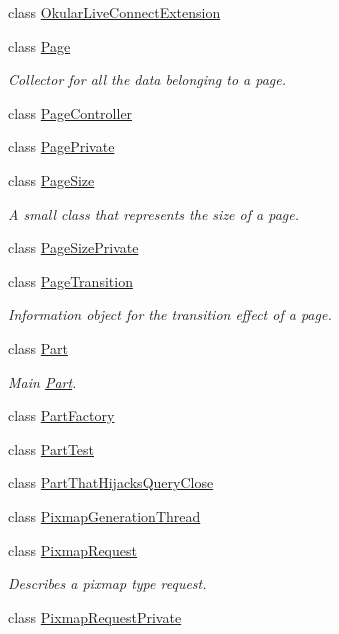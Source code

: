\begin{DoxyCompactItemize}
class \hyperlink{classOkular_1_1OkularLiveConnectExtension}{Okular\+Live\+Connect\+Extension}
\item 
class \hyperlink{classOkular_1_1Page}{Page}
\begin{DoxyCompactList}\small\item\em Collector for all the data belonging to a page. \end{DoxyCompactList}\item 
class \hyperlink{classOkular_1_1PageController}{Page\+Controller}
\item 
class \hyperlink{classOkular_1_1PagePrivate}{Page\+Private}
\item 
class \hyperlink{classOkular_1_1PageSize}{Page\+Size}
\begin{DoxyCompactList}\small\item\em A small class that represents the size of a page. \end{DoxyCompactList}\item 
class \hyperlink{classOkular_1_1PageSizePrivate}{Page\+Size\+Private}
\item 
class \hyperlink{classOkular_1_1PageTransition}{Page\+Transition}
\begin{DoxyCompactList}\small\item\em Information object for the transition effect of a page. \end{DoxyCompactList}\item 
class \hyperlink{classOkular_1_1Part}{Part}
\begin{DoxyCompactList}\small\item\em Main \hyperlink{classOkular_1_1Part}{Part}. \end{DoxyCompactList}\item 
class \hyperlink{classOkular_1_1PartFactory}{Part\+Factory}
\item 
class \hyperlink{classOkular_1_1PartTest}{Part\+Test}
\item 
class \hyperlink{classOkular_1_1PartThatHijacksQueryClose}{Part\+That\+Hijacks\+Query\+Close}
\item 
class \hyperlink{classOkular_1_1PixmapGenerationThread}{Pixmap\+Generation\+Thread}
\item 
class \hyperlink{classOkular_1_1PixmapRequest}{Pixmap\+Request}
\begin{DoxyCompactList}\small\item\em Describes a pixmap type request. \end{DoxyCompactList}\item 
class \hyperlink{classOkular_1_1PixmapRequestPrivate}{Pixmap\+Request\+Private}

\end{DoxyCompactItemize}
